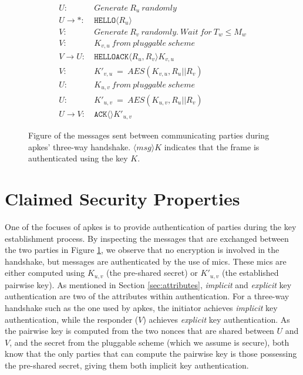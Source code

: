 
\begin{figure}[h]
\begin{tcolorbox}[title=Three-way handshake in APKES]
\begin{align*}
U:\ & Generate\ R_u\ randomly\\
U \rightarrow *:\ & \texttt{HELLO}\langle{R_u}\rangle{}\\
V:\ & Generate\ R_v\ randomly.\ Wait\ for\ T_w \leq M_w\\
V:\ & K_{v,u}\ from\ pluggable\ scheme\\
V \rightarrow U:\ & \texttt{HELLOACK}\langle{R_u, R_v}\rangle{K_{v,u}}\\
V:\ & K'_{v,u}\ =\ AES(K_{v,u}, R_u || R_v)\\
U:\ & K_{u,v}\ from\ pluggable\ scheme\\
U:\ & K'_{u,v}\ =\ AES(K_{u,v}, R_u || R_v)\\
U \rightarrow V:\ & \texttt{ACK}\langle{}\rangle{K'_{u,v}}
\end{align*}
\end{tcolorbox}
\caption{Figure of the messages sent between communicating parties during \gls{apkes}' three-way handshake. $\langle{msg}\rangle{K}$ indicates that the frame is authenticated using the key $K$.}
\label{fig:apkes-handshake}
\end{figure}

\newpage

\section{Claimed Security Properties}

One of the focuses of \gls{apkes} is to provide authentication of parties during the key establishment process. By inspecting the messages that are exchanged between the two parties in Figure \ref{fig:apkes-handshake}, we observe that no encryption is involved in the handshake, but messages are authenticated by the use of \gls{mic}s. These \gls{mic}s are either computed using $K_{u,v}$ (the pre-shared secret) or $K'_{u,v}$ (the established pairwise key). As mentioned in Section \ref{sec:attributes}, \emph{implicit} and \emph{explicit} key authentication are two of the attributes within authentication. For a three-way handshake such as the one used by \gls{apkes}, the initiator achieves \emph{implicit} key authentication, while the responder ($V$) achieves \emph{explicit} key authentication. As the pairwise key is computed from the two nonces that are shared between $U$ and $V$, and the secret from the pluggable scheme (which we assume is secure), both know that the only parties that can compute the pairwise key is those possessing the pre-shared secret, giving them both implicit key authentication. 

